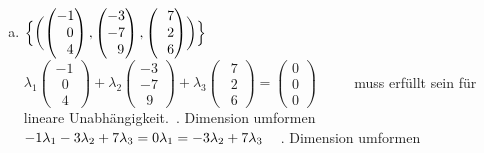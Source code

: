 \documentclass[10pt,ngerman]{scrartcl}
\begin{document}
\begin{enumerate}[1.]
\begin{enumerate}[(a)]
	~\newline
	
	\item
	\begin{math}\Bigl\{  \biggl ( \begin{pmatrix}-1 \\ ~~0 \\ ~~4\end{pmatrix} , \begin{pmatrix}-3 \\ -7 \\ ~~9\end{pmatrix} , \begin{pmatrix}~~7 \\ ~~2 \\ ~~6\end{pmatrix}\biggr ) \Bigr\} \end{math}
	 \newline~\newline~\newline
	\begin{math}\lambda _1\begin{pmatrix}-1 \\ ~~0 \\ ~~4\end{pmatrix} + \lambda _2 \begin{pmatrix}-3 \\ -7 \\ ~~9\end{pmatrix} + \lambda _3 \begin{pmatrix}~~7 \\ ~~2 \\ ~~6\end{pmatrix} = \begin{pmatrix}0 \\ 0 \\ 0\end{pmatrix} \end{math} ~~~~ muss erfüllt sein für lineare Unabhängigkeit.\newline~. Dimension umformen\newline
	 \begin{math}
	-1 \lambda _1 - 3 \lambda _2 + 7 \lambda _3 = 0 \newline
	\lambda _1 = -3 \lambda _2 + 7 \lambda _3 
	\end{math}
	\newline ~ . Dimension umformen\newline

\end{enumerate}
\end{enumerate}
\end{document}

